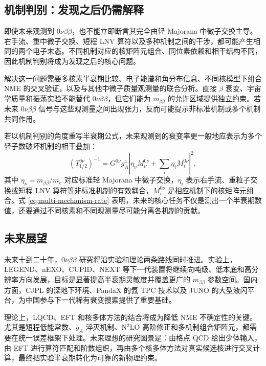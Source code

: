 \documentclass[12pt,a4paper]{ctexart}
\begin{document}
\subsection{机制判别：发现之后仍需解释}

即使未来观测到 $0\nu\beta\beta$，也不能立即断言其完全由轻 Majorana 中微子交换主导。右手流、重中微子交换、短程 LNV 算符以及多种机制之间的干涉，都可能产生相同的两个电子末态。不同机制对应的核矩阵元组合、同位素依赖和相干结构不同，因此机制判别将成为发现之后的核心问题。

解决这一问题需要多核素半衰期比较、电子能谱和角分布信息、不同核模型下组合 NME 的交叉验证，以及与其他中微子质量观测量的联合分析。直接 $\beta$ 衰变、宇宙学质量和振荡实验不能替代 $0\nu\beta\beta$，但它们能为 $m_{\beta\beta}$ 的允许区域提供独立约束。若未来 $0\nu\beta\beta$ 信号与这些观测量之间出现张力，反而可能提示非标准机制或多个机制共同作用。

若以机制判别的角度重写半衰期公式，未来观测到的衰变率更一般地应表示为多个轻子数破坏机制的相干叠加：
\begin{equation}
	\left(T_{1/2}^{0\nu}\right)^{-1}
	=
	G^{0\nu}g_A^4
	\left|
	\eta_\nu M_\nu^{0\nu}
	+\sum_i \eta_i M_i^{0\nu}
	\right|^2 ,
	\label{eq:multi-mechanism-rate}
\end{equation}
其中 $\eta_\nu=m_{\beta\beta}/m_e$ 对应标准轻 Majorana 中微子交换，$\eta_i$ 表示右手流、重粒子交换或短程 LNV 算符等非标准机制的有效耦合，$M_i^{0\nu}$ 是相应机制下的核矩阵元组合。式 \eqref{eq:multi-mechanism-rate} 表明，未来的核心任务不仅是测出一个半衰期数值，还要通过不同核素和不同观测量尽可能分离各机制的贡献。

\subsection{未来展望}

未来十到二十年，$0\nu\beta\beta$ 研究将沿实验和理论两条路线同时推进。实验上，LEGEND、nEXO、CUPID、NEXT 等下一代装置将继续向吨级、低本底和高分辨率方向发展，目标是显著提高半衰期灵敏度并覆盖更广的 $m_{\beta\beta}$ 参数空间。国内方面，CJPL 的深地下环境、PandaX 的氙 TPC 技术以及 JUNO 的大型液闪平台，为中国参与下一代稀有衰变搜索提供了重要基础。

理论上，LQCD、EFT 和核多体方法的结合将成为降低 NME 不确定性的关键。尤其是短程低能常数、$g_A$ 淬灭机制、N$^2$LO 高阶修正和多机制组合矩阵元，都需要在统一误差框架下处理。未来理想的研究图景是：由格点 QCD 给出少体输入，由 EFT 进行算符匹配和阶数组织，再由多个核多体方法对真实候选核进行交叉计算，最终把实验半衰期转化为可靠的新物理约束。
\end{document}
